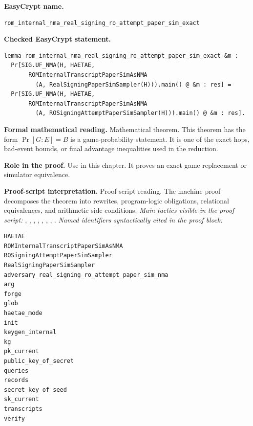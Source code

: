 \begin{formaltheorem}
\noindent\textbf{EasyCrypt name.}
\begin{lstlisting}[language=EasyCrypt,basicstyle=\ttfamily\scriptsize]
rom_internal_nma_real_signing_ro_attempt_paper_sim_exact
\end{lstlisting}
\noindent\textbf{Checked EasyCrypt statement.}
\begin{lstlisting}[language=EasyCrypt,basicstyle=\ttfamily\scriptsize]
lemma rom_internal_nma_real_signing_ro_attempt_paper_sim_exact &m :
  Pr[SIG.UF_NMA(H, HAETAE,
       ROMInternalTranscriptPaperSimAsNMA
         (A, RealSigningPaperSimSampler(H))).main() @ &m : res] =
  Pr[SIG.UF_NMA(H, HAETAE,
       ROMInternalTranscriptPaperSimAsNMA
         (A, ROSigningAttemptPaperSimSampler(H))).main() @ &m : res].
\end{lstlisting}
\noindent\textbf{Formal mathematical reading.}
Mathematical theorem. This theorem has the form \(\Pr[G:E] = B\) is a game-probability statement.  It is one of the exact hops, bad-event bounds, or final advantage inequalities used in the reduction.

\noindent\textbf{Role in the proof.}
Use in this chapter. It proves an exact game replacement or simulator equivalence.

\noindent\textbf{Proof-script interpretation.}
Proof-script reading. The machine proof decomposes the theorem into rewrites, program-logic obligations, relational equivalences, and arithmetic side conditions.
\emph{Main tactics visible in the proof script:} , , , , , , , .
\emph{Named identifiers syntactically cited in the proof block:}
\begin{lstlisting}[language=EasyCrypt,basicstyle=\ttfamily\scriptsize]
HAETAE
ROMInternalTranscriptPaperSimAsNMA
ROSigningAttemptPaperSimSampler
RealSigningPaperSimSampler
adversary_real_signing_ro_attempt_paper_sim_nma
arg
forge
glob
haetae_mode
init
keygen_internal
kg
pk_current
public_key_of_secret
queries
records
secret_key_of_seed
sk_current
transcripts
verify
\end{lstlisting}

\end{formaltheorem}

